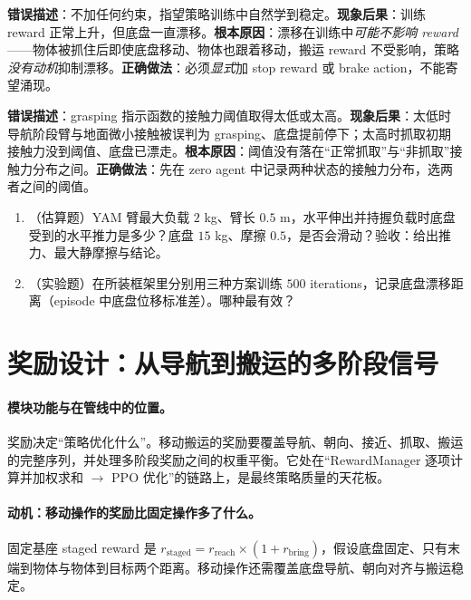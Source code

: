 \begin{pitfall}[认为“策略会自己学到不漂移”]
\textbf{错误描述}：不加任何约束，指望策略训练中自然学到稳定。\textbf{现象后果}：训练 reward 正常上升，但底盘一直漂移。\textbf{根本原因}：漂移在训练中\emph{可能不影响 reward}——物体被抓住后即使底盘移动、物体也跟着移动，搬运 reward 不受影响，策略\emph{没有动机}抑制漂移。\textbf{正确做法}：必须\emph{显式}加 stop reward 或 brake action，不能寄望涌现。
\end{pitfall}

\begin{pitfall}
\textbf{错误描述}：grasping 指示函数的接触力阈值取得太低或太高。\textbf{现象后果}：太低时导航阶段臂与地面微小接触被误判为 grasping、底盘提前停下；太高时抓取初期接触力没到阈值、底盘已漂走。\textbf{根本原因}：阈值没有落在“正常抓取”与“非抓取”接触力分布之间。\textbf{正确做法}：先在 zero agent 中记录两种状态的接触力分布，选两者之间的阈值。
\end{pitfall}

\begin{practice}[底盘漂移]
\begin{enumerate}
\item （估算题）YAM 臂最大负载 $2$ kg、臂长 $0.5$ m，水平伸出并持握负载时底盘受到的水平推力是多少？底盘 $15$ kg、摩擦 $0.5$，是否会滑动？验收：给出推力、最大静摩擦与结论。
\item （实验题）在所装框架里分别用三种方案训练 $500$ iterations，记录底盘漂移距离（episode 中底盘位移标准差）。哪种最有效？
\end{enumerate}
\end{practice}

\section{奖励设计：从导航到搬运的多阶段信号}
\label{sec:rlmc-wh-reward}

\paragraph{模块功能与在管线中的位置。}奖励决定“策略优化什么”。移动搬运的奖励要覆盖导航、朝向、接近、抓取、搬运的完整序列，并处理多阶段奖励之间的权重平衡。它处在“RewardManager 逐项计算并加权求和 $\to$ PPO 优化”的链路上，是最终策略质量的天花板。

\paragraph{动机：移动操作的奖励比固定操作多了什么。}固定基座 staged reward 是 $r_{\text{staged}}=r_{\text{reach}}\times(1+r_{\text{bring}})$，假设底盘固定、只有末端到物体与物体到目标两个距离。移动操作还需覆盖底盘导航、朝向对齐与搬运稳定。

